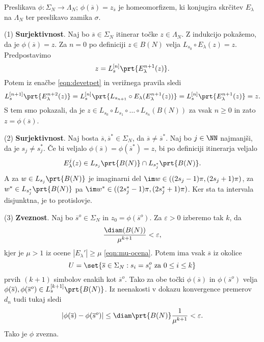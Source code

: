 \begin{izrek}
    Preslikava \(\phi \colon \Sigma_N \to \Lambda_N\); \(\phi (\overline{s}) = z_{\overline{s}}\) je homeomorfizem, ki konjugira skrčitev \(E_\lambda\) na \(\Lambda_N\) ter preslikavo zamika \(\sigma\). 
\end{izrek}

\begin{dokaz}
    (1) \textbf{Surjektivnost}. Naj bo \(\overline{s} \in \Sigma_N\) itinerar točke \(z \in \Lambda_N\). Z indukcijo pokažemo, da je \(\phi (\overline{s}) = z\). Za \(n = 0\) po definiciji \(z \in B (N)\) velja \(L_{s_0} \circ E_\lambda (z) = z\). Predpostavimo
    \[z = L_{s}^{[n]} \prt{E_{\lambda}^{n + 1} (z)}.\]
    Potem iz enačbe \eqref{eqn:devetpet} in verižnega pravila sledi
    \[L_{s}^{[n + 1]} \prt{E_{\lambda}^{n + 2} (z)} = L_{s}^{[n]} \prt{L_{s_{n + 1}} \circ E_\lambda (E_\lambda^{n + 1} (z))} = L_{s}^{[n]} \prt{E_\lambda^{n + 1} (z)} = z.\]
    S tem smo pokazali, da je \(z \in L_{s_0} \circ L_{s_1} \circ \dots \circ L_{s_n} (B (N))\) za vsak \(n \geq 0\) in zato \(z = \phi (\overline{s})\).

    (2) \textbf{Surjektivnost}. Naj bosta \(\overline{s}, \overline{s}^* \in \Sigma_N\), da \(\overline{s} \neq \overline{s}^*\). Naj bo \(j \in \NN\) najmanjši, da je \(s_j \neq s_j^*\). Če bi veljalo \(\phi (\overline{s}) = \phi (\overline{s}^*) = z\), bi po definiciji itinerarja veljalo
    \[E_\lambda^j (z)\in L_{s_j} \prt{B (N)} \cap L_{s_j^*} \prt{B (N)}.\]
    A za \(w \in L_{s_j} \prt{B (N)}\) je imaginarni del \(\im w \in ((2 s_j - 1) \pi, (2 s_j + 1) \pi)\), za \(w^* \in L_{s_j^*} \prt{B (N)}\) pa \(\im w^* \in ((2 s_j^* - 1) \pi, (2 s_j^* + 1) \pi)\). Ker sta ta intervala disjunktna, je to protislovje.

    (3) \textbf{Zveznost}. Naj bo \(\overline{s}^o \in \Sigma_N\) in \(z_0 = \phi (\overline{s}^o)\). Za \(\varepsilon > 0\) izberemo tak \(k\), da
    \[\frac{\diam (B (N))}{\mu^{k + 1}} < \varepsilon,\]
    kjer je \(\mu > 1\) iz ocene \(|E_\lambda'| \geq \mu\) \eqref{eqn:mu-ocena}. Potem ima vsak \(\overline{s}\) iz okolice
    \[U = \set{\overline{s} \in \Sigma_N : s_i = s_i^o \text{ za } 0 \leq i \leq k}\]
    prvih \((k + 1)\) simbolov enakih kot \(\overline{s}^o\). Tako za obe točki \(\phi (\overline{s})\) in \(\phi (\overline{s}^o)\) velja \(\phi (\overline{s}), \phi (\overline{s}^o) \in L_s^{[k + 1]} \prt{B (N)}\). Iz neenakosti v dokazu konvergence premerov \(d_n\) tudi tukaj sledi
    \[\left| \phi (\overline{s}) - \phi (\overline{s}^o) \right| \leq \diam \prt{B (N)} \frac{1}{\mu^{k + 1}} < \varepsilon.\]
    Tako je \(\phi\) zvezna.


\end{dokaz}
